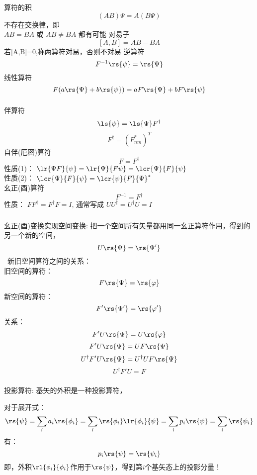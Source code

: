 \begin{frame}
 \frametitle{}
 \begin{itemize}
    \Item 算符的积 
    $$ (AB)\Psi=A(B\Psi) $$
    不存在交换律，即 \\
    $AB=BA$ 或 $AB\ne BA$ 都有可能
    \Item 对易子
    $$ [A,B]=AB-BA$$
    若[A,B]=0,称两算符对易，否则不对易
    \Item 逆算符  
    \[F^{-1}\rs{\psi}=\rs{\Psi} \] 
    \Item 线性算符 \[F (a\rs{\Psi} +b\rs{\psi}) = aF \rs{\Psi} +bF\rs{\psi}\]
\end{itemize}
\end{frame}

\begin{frame}
    \frametitle{}
    \begin{itemize}
        \Item 伴算符   \[\ls{\psi}=\ls{\Psi}F^{\dagger} \]
        \[F^{\dagger} = (F^* _{nm})^T \]
        \Item 自伴(厄密)算符  \[F = F^{\dagger} \] 
        性质(1)： $\lr{\Psi F}{\psi}=\lr{\Psi }{F \psi}=\lcr{\Psi }{F} {\psi}$ \\
        性质(2)： $\lcr{\Psi }{F} {\psi}=\lcr{\psi }{F} {\Psi}^*$ \\ \vspace{0.6em}
        \Item 幺正(酉)算符    \[F^{-1} = F^{\dagger} \] 性质： $FF^{\dagger}=F^{\dagger}F=I$, 通常写成 $UU^{\dagger}=U^{\dagger}U=I$ \\ \vspace{1.0em}
    \end{itemize}        
\end{frame}

\begin{frame}
    \frametitle{}
    \Tips 幺正(酉)变换实现空间变换: 把一个空间所有矢量都用同一幺正算符作用，得到的另一个新的空间，
    \[U\rs{\Psi} =\rs{\Psi'}\]
    {\Bullet}~新旧空间算符之间的关系： \\
        旧空间的算符： \[F \rs{\Psi}=\rs{\varphi}\]
        新空间的算符： \[F' \rs{\Psi'}=\rs{\varphi'}\]
        关系：
        \[F' U\rs{\Psi}=U\rs{\varphi}\]
        \[F' U\rs{\Psi}=UF \rs{\Psi}\]
        \[U^{\dagger}F' U\rs{\Psi}=U^{\dagger}UF \rs{\Psi}\]
        \[U^{\dagger}F' U=F \]
\end{frame}

\begin{frame}
    \frametitle{}
    \begin{itemize}
    \Item 投影算符: 基矢的外积是一种投影算符，
    \end{itemize}
    对于展开式： 
    \[\rs{\psi}=\sum_i a_i \rs{\phi_i}=\sum_i \rs{\phi_i} \lr{\phi_i}{\psi}=\sum_i p_i \rs{\psi} =\sum_i \rs{\psi_i}\]
    有：\[p_i \rs{\psi} =\rs{\psi_i}\]
    即，外积$\rl{\phi_i}{\phi_i}$作用于$\rs{\psi}$，得到第$i$个基矢态上的投影分量！\\
\end{frame}

